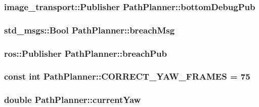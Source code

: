 \subsubsection[{\texorpdfstring{bottom\+Debug\+Pub}{bottomDebugPub}}]{\setlength{\rightskip}{0pt plus 5cm}image\+\_\+transport\+::\+Publisher Path\+Planner\+::bottom\+Debug\+Pub}\hypertarget{classPathPlanner_aae9f1307dab87b0979497f41553dc34e}{}\label{classPathPlanner_aae9f1307dab87b0979497f41553dc34e}
\subsubsection[{\texorpdfstring{breach\+Msg}{breachMsg}}]{\setlength{\rightskip}{0pt plus 5cm}std\+\_\+msgs\+::\+Bool Path\+Planner\+::breach\+Msg}\hypertarget{classPathPlanner_a1ac63d92d2bee1644f7b2e80d6cc5c09}{}\label{classPathPlanner_a1ac63d92d2bee1644f7b2e80d6cc5c09}
\subsubsection[{\texorpdfstring{breach\+Pub}{breachPub}}]{\setlength{\rightskip}{0pt plus 5cm}ros\+::\+Publisher Path\+Planner\+::breach\+Pub}\hypertarget{classPathPlanner_a6ad35bcf1143889a2273362476028445}{}\label{classPathPlanner_a6ad35bcf1143889a2273362476028445}
\subsubsection[{\texorpdfstring{C\+O\+R\+R\+E\+C\+T\+\_\+\+Y\+A\+W\+\_\+\+F\+R\+A\+M\+ES}{CORRECT_YAW_FRAMES}}]{\setlength{\rightskip}{0pt plus 5cm}const int Path\+Planner\+::\+C\+O\+R\+R\+E\+C\+T\+\_\+\+Y\+A\+W\+\_\+\+F\+R\+A\+M\+ES = 75}\hypertarget{classPathPlanner_ab80757ecd2962cc2e5bd64c300e31628}{}\label{classPathPlanner_ab80757ecd2962cc2e5bd64c300e31628}
\subsubsection[{\texorpdfstring{current\+Yaw}{currentYaw}}]{\setlength{\rightskip}{0pt plus 5cm}double Path\+Planner\+::current\+Yaw}\hypertarget{classPathPlanner_a069162f445adcdef1e916ce8d43fd34a}{}\label{classPathPlanner_a069162f445adcdef1e916ce8d43fd34a}
